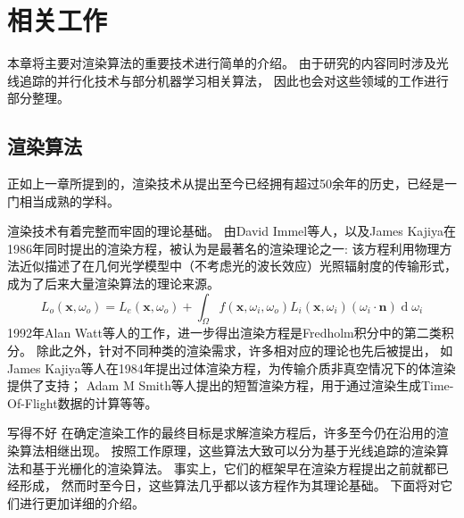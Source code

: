 \chapter{相关工作}
\label{cha:relatedwork}
本章将主要对渲染算法的重要技术进行简单的介绍。
由于研究的内容同时涉及光线追踪的并行化技术与部分机器学习相关算法，
因此也会对这些领域的工作进行部分整理。

\section{渲染算法}

正如上一章所提到的，渲染技术从提出至今已经拥有超过50余年的历史，已经是一门相当成熟的学科。


渲染技术有着完整而牢固的理论基础。
由David Immel等人\cite{RenderingEquation1}，以及James Kajiya\cite{RenderingEquation2}在1986年同时提出的渲染方程，被认为是最著名的渲染理论之一:
该方程利用物理方法近似描述了在几何光学模型中（不考虑光的波长效应）光照辐射度的传输形式，成为了后来大量渲染算法的理论来源。
\begin{equation}
L_o(\mathbf{x}, \omega_o)=L_e(\mathbf{x},\omega_o)+\int_{\Omega} f(\mathbf{x}, \omega_i, \omega_o) L_i(\mathbf{x}, \omega_i) (\omega_i \cdot \mathbf{n}) \operatorname d\omega_i
\end{equation}
1992年Alan Watt等人的工作\cite{Fredholm}，进一步得出渲染方程是Fredholm积分中的第二类积分。
除此之外，针对不同种类的渲染需求，许多相对应的理论也先后被提出，
如James Kajiya等人在1984年提出过体渲染方程\cite{VolumnRenderingEquation}，为传输介质非真空情况下的体渲染提供了支持；
Adam M Smith等人提出的短暂渲染方程\cite{TransientEquation}，用于通过渲染生成Time-Of-Flight数据的计算等等。


写得不好{
    在确定渲染工作的最终目标是求解渲染方程后，许多至今仍在沿用的渲染算法相继出现。
    按照工作原理，这些算法大致可以分为基于光线追踪的渲染算法和基于光栅化的渲染算法。   
    事实上，它们的框架早在渲染方程提出之前就都已经形成，
    然而时至今日，这些算法几乎都以该方程作为其理论基础。
}
下面将对它们进行更加详细的介绍。

